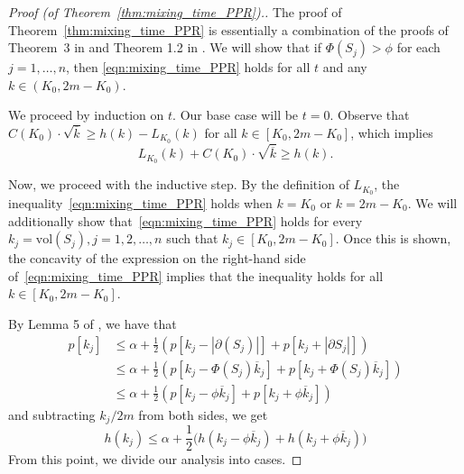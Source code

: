 \documentclass[11pt,twoside]{article}
\newcommand{\vol}{\mathrm{vol}}
\newcommand{\abs}[1]{\left \lvert #1 \right \rvert}
\newcommand{\1}{\mathbbm{1}}
\begin{document}
\begin{proof}[Proof (of Theorem~\ref{thm:mixing_time_PPR}).]
	The proof of Theorem~\ref{thm:mixing_time_PPR} is essentially a combination of the proofs of Theorem~3 in \citet{andersen2006} and Theorem 1.2 in \citet{lovasz1990}. We will show that if $\Phi(S_j) > \phi$ for each $j = 1,\ldots,n$, then \eqref{eqn:mixing_time_PPR} holds for all $t$ and any $k \in (K_0,2m - K_0)$.
	
	We proceed by induction on $t$. Our base case will be $t = 0$. Observe that $C(K_0) \cdot \sqrt{\overline{k}} \geq  h(k) - L_{K_0}(k)$ for all $k \in [K_0,2m - K_0]$, which implies
	\begin{equation*}
	L_{K_0}(k) + C(K_0) \cdot \sqrt{\overline{k}} \geq h(k).
	\end{equation*}
	
	Now, we proceed with the inductive step. By the definition of $L_{K_0}$, the inequality~\eqref{eqn:mixing_time_PPR} holds when $k = K_0$ or $k = 2m - K_0$. We will additionally show that~\eqref{eqn:mixing_time_PPR} holds for every $k_j = \vol(S_j), j = 1,2,\ldots,n$ such that $k_j \in [K_0, 2m - K_0]$. Once this is shown, the concavity of the expression on the right-hand side of~\eqref{eqn:mixing_time_PPR} implies that the inequality holds for all $k \in [K_0,2m - K_0]$.
	
	By Lemma 5 of \citet{andersen2006}, we have that
	\begin{align}
	p[k_j] & \leq \alpha + \frac{1}{2}  \left(p[k_j - \abs{\partial(S_j)}] + p[k_j + \abs{\partial{S_j}}]  \right) \nonumber\\
	& \leq \alpha + \frac{1}{2} \left(p[k_j - \Phi(S_j) \overline{k}_j] + p[k_j + \Phi(S_j) \overline{k}_j]  \right) \nonumber \\
	& \leq \alpha + \frac{1}{2} \left(p[k_j - \phi \overline{k}_j] + p[k_j + \phi \overline{k}_j]\right) \nonumber
	\end{align}
	and subtracting $k_j/2m$ from both sides, we get
	\begin{equation}
	\label{eqn:mixing_time_PPR_pf1}
	h(k_j) \leq \alpha + \frac{1}{2} \bigl(h(k_j - \phi \overline{k}_j) + h(k_j +  \phi \overline{k}_j) \bigr)
	\end{equation}
	From this point, we divide our analysis into cases. 
	

\end{proof}
\end{document}
